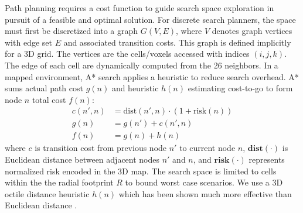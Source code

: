 Path planning requires a cost function to guide search space exploration in pursuit of a feasible and optimal solution. For discrete search planners, the space must first be discretized into a graph ${G}({V},{E})$, where ${V}$ denotes graph vertices with edge set ${E}$ and associated transition costs. This graph is defined implicitly for a 3D grid. The vertices are the cells/voxels accessed with indices $(i,j,k)$. The edge of each cell are dynamically computed from the 26 neighbors. In a mapped environment, A* search applies a heuristic to reduce search overhead.  A* sums actual path cost $g(n)$ and heuristic $h(n)$ estimating cost-to-go to form node $n$ total cost $f(n)$:
\begin{align}
    c(n', n) &= \text{dist}(n', n) 
    \cdot (1 + \text{risk}(n)) \label{eq:ch5_risk_function_planner} \\ 
    g(n) &= g(n') + c(n', n)\\
    f(n) &= g(n) + h(n)
\end{align}
where $c$ is transition cost from previous node $n'$ to current node $n$, 
$\mathbf{dist}(\cdot)$ is Euclidean distance between adjacent nodes $n'$ and $n$, and $\mathbf{risk}(\cdot)$ represents normalized risk encoded in the 3D map. 
The search space is limited to cells within the the radial footprint $R$ to bound worst case scenarios. We use a 3D octile distance heuristic $h(n)$ which has been shown much more effective than Euclidean distance \cite{nash_lazy_2010}.  %




